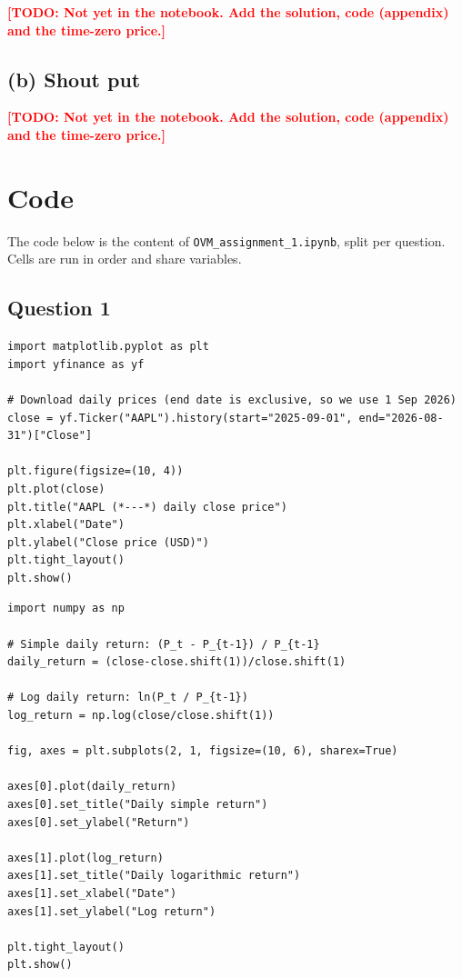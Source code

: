 \documentclass[11pt,a4paper]{article}
\newcommand{\todo}[1]{\textcolor{red}{\textbf{[TODO: #1]}}}
\begin{document}
\todo{Not yet in the notebook. Add the solution, code (appendix) and the time-zero price.}

\subsection*{(b) Shout put}

\todo{Not yet in the notebook. Add the solution, code (appendix) and the time-zero price.}

\appendix
\section{Code}
\label{app:code}

The code below is the content of \texttt{OVM\_assignment\_1.ipynb}, split per question.
Cells are run in order and share variables.

\subsection{Question 1}

\begin{lstlisting}[caption={Q1a: download and plot the daily close prices.}, label={lst:q1a-price}]
import matplotlib.pyplot as plt
import yfinance as yf

# Download daily prices (end date is exclusive, so we use 1 Sep 2026)
close = yf.Ticker("AAPL").history(start="2025-09-01", end="2026-08-31")["Close"]

plt.figure(figsize=(10, 4))
plt.plot(close)
plt.title("AAPL (*---*) daily close price")
plt.xlabel("Date")
plt.ylabel("Close price (USD)")
plt.tight_layout()
plt.show()
\end{lstlisting}

\begin{lstlisting}[caption={Q1a: daily simple and logarithmic returns.}, label={lst:q1a-returns}]
import numpy as np

# Simple daily return: (P_t - P_{t-1}) / P_{t-1}
daily_return = (close-close.shift(1))/close.shift(1)

# Log daily return: ln(P_t / P_{t-1})
log_return = np.log(close/close.shift(1))

fig, axes = plt.subplots(2, 1, figsize=(10, 6), sharex=True)

axes[0].plot(daily_return)
axes[0].set_title("Daily simple return")
axes[0].set_ylabel("Return")

axes[1].plot(log_return)
axes[1].set_title("Daily logarithmic return")
axes[1].set_xlabel("Date")
axes[1].set_ylabel("Log return")

plt.tight_layout()
plt.show()
\end{lstlisting}
\end{document}
